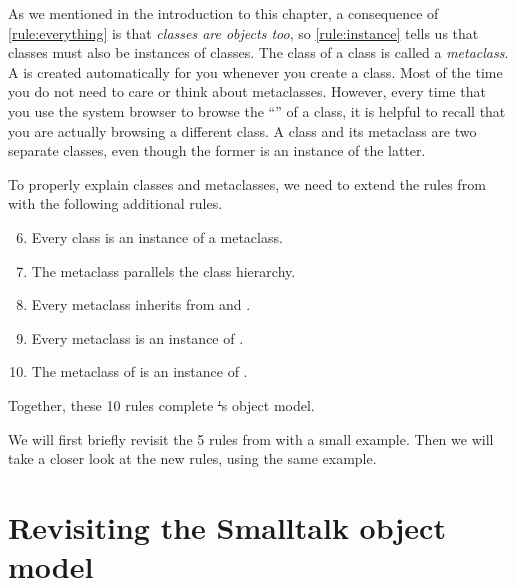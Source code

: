 \documentclass[a4paper,10pt,twoside]{book}
\begin{document}
As we mentioned in the introduction to this chapter, a consequence of \ref{rule:everything} is that \emph{classes are objects too}, so \ref{rule:instance} tells us that classes must also be instances of classes.
The class of a class is called a \emph{metaclass}.
\label{sec:metaclassIntro}
A  is created automatically for you whenever you create a class.
Most of the time you do not need to care or think about metaclasses.
However, every time that you use the system browser to browse the ``'' of a class, it is helpful to recall that you are actually browsing a different class.
A class and its metaclass are two separate classes, even though the former is an instance of the latter. 

To properly explain classes and metaclasses, we need to extend the rules from  with the following additional rules.

\begin{enumerate}[label={\textbf{Rule \arabic{*}}.}, ref={Rule \arabic{*}}, leftmargin=*, widest=10]
\setcounter{enumi}{5}
\item{} \label{rule:metaclass}
	Every class is an instance of a metaclass.

\item{} \label{rule:parallelhierarchy}
	The metaclass  parallels the class hierarchy.

\item{} \label{rule:behavior}
	Every metaclass inherits from  and .

\item{} \label{rule:metaclassclass}
	Every metaclass is an instance of .

\item{} \label{rule:metaclassmetaclass}
	The metaclass of  is an instance of .

\end{enumerate}

\noindent
Together, these 10 rules complete \st's object model.

We will first briefly revisit the 5 rules from  with a small example.
Then we will take a closer look at the new rules, using the same example.

\section{Revisiting the Smalltalk object model}
\end{document}
